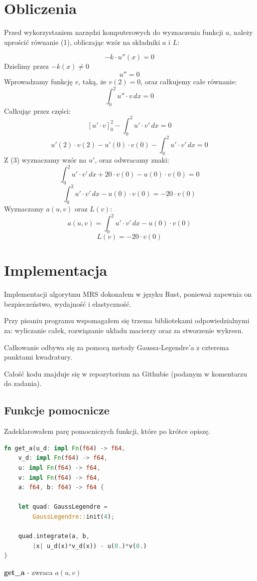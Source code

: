 \documentclass[12pt]{article}
\begin{document}
\newpage
\section{Obliczenia}
Przed wykorzystaniem narzędzi komputerowych do wyznaczenia funkcji $u$, 
 należy uprościć równanie (1), obliczając wzór na składniki $a$ i $L$:

\[
	-k \cdot u''(x) = 0	
\]
Dzielimy przez $-k(x) \ne 0$
\[
	u'' = 0	
\]
Wprowadzamy funkcję $v$, taką, że $v(2) = 0$, oraz całkujemy całe równanie:
\[
	\int_{0}^{2}u''\cdot v \,dx = 0
\]
Całkując przez części:
\[
	\left[ u' \cdot v  \right]_0^2 - \int_{0}^{2}u'\cdot v' \,dx = 0
\]
\[
	u'(2) \cdot v(2) - u'(0) \cdot v(0) - \int_{0}^{2}u'\cdot v' \,dx = 0
\]
Z (3) wyznaczamy wzór na $u'$, oraz odwracamy znaki:
\[
	\int_{0}^{2}u'\cdot v' \,dx + 20 \cdot v(0) - u(0) \cdot v(0) = 0
\]
\[
	\int_{0}^{2}u'\cdot v' \,dx - u(0) \cdot v(0) = -20 \cdot v(0)
\]
Wyznaczamy $a(u, v)$ oraz $L(v)$:
\begin{equation}
	a(u, v) = \int_{0}^{2}u'\cdot v' \,dx - u(0) \cdot v(0)
\end{equation}
\begin{equation}
	L(v) = -20 \cdot v(0)
\end{equation}

\newpage
\section{Implementacja}
Implementacji algorytmu MRS dokonałem w języku Rust, ponieważ zapewnia
on bezpieczeństwo, wydajność i elastyczność. 

\noindent Przy pisaniu programu wspomagałem się trzema bibliotekami
 odpowiedzialnymi za: wyliczanie całek, rozwiązanie układu macierzy oraz za
 stworzenie wykresu.

\noindent Całkowanie odbywa się za pomocą metody Gaussa-Legendre'a z czterema punktami kwadratury.

\noindent Całość kodu znajduje się w repozytorium na Githubie (podanym w komentarzu do zadania).

\subsection{Funkcje pomocnicze}
Zadeklarowałem parę pomocniczych funkcji, które po krótce opiszę.


\begin{lstlisting}[language=Rust, style=boxed]
fn get_a(u_d: impl Fn(f64) -> f64, 
	v_d: impl Fn(f64) -> f64,
	u: impl Fn(f64) -> f64, 
	v: impl Fn(f64) -> f64,
	a: f64, b: f64) -> f64 {
		
    let quad: GaussLegendre = 
		GaussLegendre::init(4);
		
    quad.integrate(a, b,
		|x| u_d(x)*v_d(x)) - u(0.)*v(0.)
}
\end{lstlisting}
\centerline{\textbf{get\_a} - zwraca $a(u,v)$}
\vskip 1cm
\end{document}

